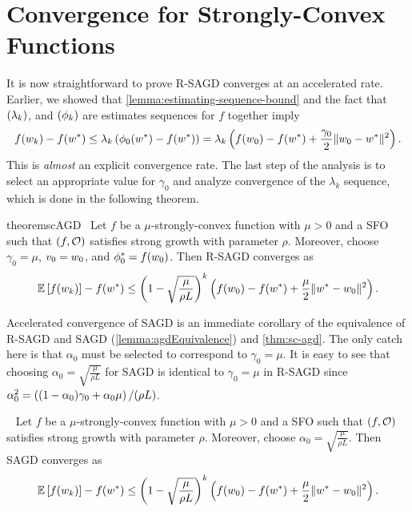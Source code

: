 \section{Convergence for Strongly-Convex Functions}\label{sec:agd-sc}

It is now straightforward to prove R-SAGD converges at an accelerated rate. 
Earlier, we showed that \autoref{lemma:estimating-sequence-bound} and the fact that \( \seq{\lambda_k} \), and \( \seq{\phi_k} \) are estimates sequences for \( f \) together imply
\[ f(\wk) - f(\wopt) \leq \lambda_k \rbr{\phi_0(\wopt) - f(\wopt)} = \lambda_k \rbr{f(\w_0) - f(\wopt) + \frac{\gamma_0}{2} \norm{\w_0 - \wopt}^2}. \]
This is \emph{almost} an explicit convergence rate. 
The last step of the analysis is to select an appropriate value for \( \gamma_0 \) and analyze convergence of the \( \lambda_k \) sequence, which is done in the following theorem.

\begin{restatable}{theorem}{scAGD}~\label{thm:sc-agd}
    Let \( f \) be a \( \mu \)-strongly-convex function with \( \mu > 0 \) and \oracle{} a SFO such that \( \rbr{f, \oracle{}} \) satisfies strong growth with parameter \( \rho \).
    Moreover, choose \( \gamma_0 = \mu \), \( v_0 = \w_0 \), and \( \phi_0^* = f(\w_0) \).
    Then R-SAGD converges as  
    \[ \E\sbr{f(\wk)} - f(\wopt) \leq \rbr{1 - \sqrt{\frac{\mu}{\rho L}}}^{k} \rbr{ f(w_0) - f(\wopt) + \frac{\mu}{2} \norm{\wopt - \w_0}^2 }.  \]
\end{restatable}

Accelerated convergence of SAGD is an immediate corollary of the equivalence of R-SAGD and SAGD (\autoref{lemma:agdEquivalence}) and \autoref{thm:sc-agd}.
The only catch here is that \( \alpha_0 \) must be selected to correspond to \( \gamma_0 = \mu \).
It is easy to see that choosing \( \alpha_0 = \sqrt{\frac{\mu}{\rho L}} \) for SAGD is identical to \( \gamma_0 = \mu \) in R-SAGD since \( \alpha_0^2 = \rbr{(1 - \alpha_0)\gamma_0 + \alpha_0 \mu} / (\rho L) \).

\begin{corollary}~\label{cor:sc-agd}
    Let \( f \) be a \( \mu \)-strongly-convex function with \( \mu > 0 \) and \oracle{} a SFO such that \( \rbr{f, \oracle{}} \) satisfies strong growth with parameter \( \rho \).
    Moreover, choose \( \alpha_0 = \sqrt{\frac{\mu}{\rho L}} \). 
    Then SAGD converges as  
    \[ \E\sbr{f(\wk)} - f(\wopt) \leq \rbr{1 - \sqrt{\frac{\mu}{\rho L}}}^{k} \rbr{ f(w_0) - f(\wopt) + \frac{\mu}{2} \norm{\wopt - \w_0}^2 }.  \]
\end{corollary}

